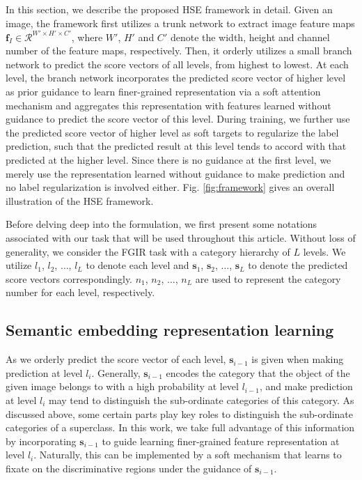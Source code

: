 \documentclass[sigconf]{acmart}
\begin{document}
In this section, we describe the proposed HSE framework in detail. Given an image, the framework first utilizes a trunk network to extract image feature maps $\mathbf{f}_I \in \mathcal{R}^{W' \times H' \times C'}$, where $W'$, $H'$ and $C'$ denote the width, height and channel number of the feature maps, respectively. Then, it orderly utilizes a small branch network to predict the score vectors of all levels, from highest to lowest. At each level, the branch network incorporates the predicted score vector of higher level as prior guidance to learn finer-grained representation via a soft attention mechanism and aggregates this representation with features learned without guidance to predict the score vector of this level. During training, we further use the predicted score vector of higher level as soft targets to regularize the label prediction, such that the predicted result at this level tends to accord with that predicted at the higher level. Since there is no guidance at the first level, we merely use the representation learned without guidance to make prediction and no label regularization is involved either. Fig. \ref{fig:framework} gives an overall illustration of the HSE framework.


Before delving deep into the formulation, we first present some notations associated with our task that will be used throughout this article. Without loss of generality, we consider the FGIR task with a category hierarchy of $L$ levels. We utilize $l_1$, $l_2$, $\dots$, $l_L$ to denote each level and $\mathbf{s}_{1}$, $\mathbf{s}_{2}$, $\dots$, $\mathbf{s}_{L}$ to denote the predicted score vectors correspondingly. $n_1$, $n_2$, $\dots$, $n_L$ are used to represent the category number for each level, respectively.


\subsection{Semantic embedding representation learning}
As we orderly predict the score vector of each level, $\mathbf{s}_{i-1}$ is given when making prediction at level $l_i$. Generally, $\mathbf{s}_{i-1}$ encodes the category that the object of the given image belongs to with a high probability at level $l_{i-1}$, and make prediction at level $l_i$ may tend to distinguish the sub-ordinate categories of this category. As discussed above, some certain parts play key roles to distinguish the sub-ordinate categories of a superclass. In this work, we take full advantage of this information by incorporating $\mathbf{s}_{i-1}$ to guide learning finer-grained feature representation at level $l_i$. Naturally, this can be implemented by a soft mechanism that learns to fixate on the discriminative regions under the guidance of $\mathbf{s}_{i-1}$.
\end{document}

